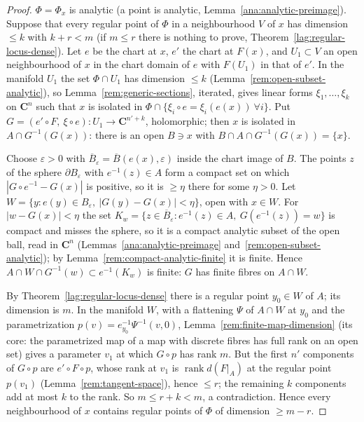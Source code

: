 \begin{proof}
\leanok
\(\Phi=\Phi_x\) is analytic (a point is analytic, Lemma~\ref{ana:analytic-preimage}). Suppose that every regular point of \(\Phi\) in a neighbourhood \(V\)
of \(x\) has dimension \(\le k\) with \(k+r<m\) (if \(m\le r\) there is nothing to prove, Theorem~\ref{lag:regular-locus-dense}). Let \(e\) be the chart at
\(x\), \(e'\) the chart at \(F(x)\), and \(U_1\subset V\) an open neighbourhood of \(x\) in the chart domain of \(e\) with \(F(U_1)\) in that of \(e'\). In the
manifold \(U_1\) the set \(\Phi\cap U_1\) has dimension \(\le k\) (Lemma~\ref{rem:open-subset-analytic}), so Lemma~\ref{rem:generic-sections}, iterated, gives
linear forms \(\xi_1,\dots,\xi_k\) on \(\mathbf C^n\) such that \(x\) is isolated in \(\Phi\cap\{\xi_i\circ e=\xi_i(e(x))\ \forall i\}\). Put
\(G=(e'\circ F,\ \xi\circ e)\colon U_1\to\mathbf C^{n'+k}\), holomorphic; then \(x\) is isolated in \(A\cap G^{-1}(G(x))\): there is an open \(B\ni x\) with
\(B\cap A\cap G^{-1}(G(x))=\{x\}\).

Choose \(\varepsilon>0\) with \(\overline B_\varepsilon=\overline B(e(x),\varepsilon)\) inside the chart image of \(B\). The points \(z\) of the sphere
\(\partial B_\varepsilon\) with \(e^{-1}(z)\in A\) form a compact set on which \(|G\circ e^{-1}-G(x)|\) is positive, so it is \(\ge\eta\) there for some \(\eta>0\).
Let \(W=\{y:e(y)\in B_\varepsilon,\ |G(y)-G(x)|<\eta\}\), open with \(x\in W\). For \(|w-G(x)|<\eta\) the set
\(K_w=\{z\in\overline B_\varepsilon:e^{-1}(z)\in A,\ G(e^{-1}(z))=w\}\) is compact and misses the sphere, so it is a compact analytic subset of the open ball, read in
\(\mathbf C^n\) (Lemmas~\ref{ana:analytic-preimage} and~\ref{rem:open-subset-analytic}); by Lemma~\ref{rem:compact-analytic-finite} it is finite. Hence
\(A\cap W\cap G^{-1}(w)\subset e^{-1}(K_w)\) is finite: \(G\) has finite fibres on \(A\cap W\).

By Theorem~\ref{lag:regular-locus-dense} there is a regular point \(y_0\in W\) of \(A\); its dimension is \(m\). In the manifold \(W\), with a flattening \(\Psi\)
of \(A\cap W\) at \(y_0\) and the parametrization \(p(v)=e_{y_0}^{-1}\Psi^{-1}(v,0)\), Lemma~\ref{rem:finite-map-dimension} (its core: the parametrized map of a
map with discrete fibres has full rank on an open set) gives a parameter \(v_1\) at which \(G\circ p\) has rank \(m\). But the first \(n'\) components of
\(G\circ p\) are \(e'\circ F\circ p\), whose rank at \(v_1\) is \(\operatorname{rank}d(F|_A)\) at the regular point \(p(v_1)\) (Lemma~\ref{rem:tangent-space}),
hence \(\le r\); the remaining \(k\) components add at most \(k\) to the rank. So \(m\le r+k<m\), a contradiction. Hence every neighbourhood of \(x\) contains
regular points of \(\Phi\) of dimension \(\ge m-r\).
\end{proof}

